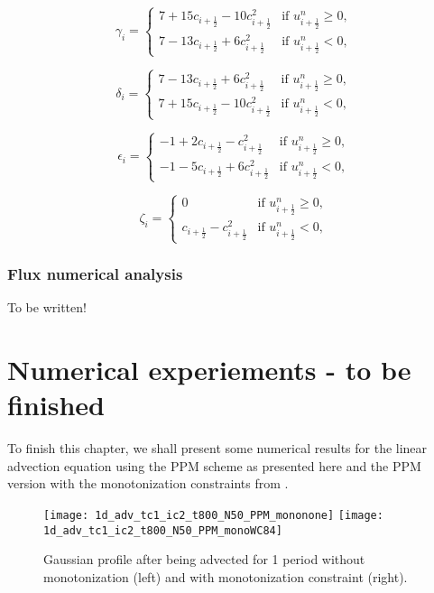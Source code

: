\begin{equation}
	\label{chp-sec-flux:numerical-flux-stencil-gamma}
	\gamma_i =  
    	\begin{cases}
		7 + 15c_{i+\frac{1}{2}} - 10c_{i+\frac{1}{2}}^2 
		& \text{if } u_{i+\frac{1}{2}}^n \geq 0,\\
		7 - 13c_{i+\frac{1}{2}}  +  6c_{i+\frac{1}{2}}^2 & \text{if } u_{i+\frac{1}{2}}^n<0,
    	\end{cases}
\end{equation}

\begin{equation}
	\label{chp-sec-flux:numerical-flux-stencil-delta}
	\delta_i =  
    	\begin{cases}
		7 - 13c_{i+\frac{1}{2}} +  6c_{i+\frac{1}{2}}^2 & \text{if } u_{i+\frac{1}{2}}^n \geq 0,\\
		7 + 15c_{i+\frac{1}{2}} - 10c_{i+\frac{1}{2}}^2 & \text{if } u_{i+\frac{1}{2}}^n<0,
    	\end{cases}
\end{equation}

\begin{equation}
	\label{chp-sec-flux:numerical-flux-stencil-epsilon}
	\epsilon_i =  
    	\begin{cases}
		-1 +  2c_{i+\frac{1}{2}} -   c_{i+\frac{1}{2}}^2 
		& \text{if } u_{i+\frac{1}{2}}^n \geq 0,\\
		-1 - 5c_{i+\frac{1}{2}} +  6c_{i+\frac{1}{2}}^2 & \text{if } u_{i+\frac{1}{2}}^n<0,
    	\end{cases}
\end{equation}

\begin{equation}
	\label{chp-sec-flux:numerical-flux-stencil-zeta}
	\zeta_i =  
    	\begin{cases}
		0 & \text{if } u_{i+\frac{1}{2}}^n \geq 0,\\
		c_{i+\frac{1}{2}}-   c_{i+\frac{1}{2}}^2 & \text{if } u_{i+\frac{1}{2}}^n<0,
    	\end{cases}
\end{equation}

\subsubsection{Flux numerical analysis }
To be written!

\section{Numerical experiements - to be finished}
\label{chp1-sec-numerical-exp}
To finish this chapter, we shall present some numerical results for the linear advection equation 
using the PPM scheme as presented here and the PPM version with the monotonization constraints 
from \citet{colella:1984}.
\begin{figure}[ht]
	\centering
	\texttt{[image: 1d\_adv\_tc1\_ic2\_t800\_N50\_PPM\_mononone]}
	\texttt{[image: 1d\_adv\_tc1\_ic2\_t800\_N50\_PPM\_monoWC84]}
	\caption{Gaussian profile after being advected for 1 period without monotonization (left) and
		with monotonization constraint (right).}
	\label{ppm-exp-gaussian}
\end{figure}

